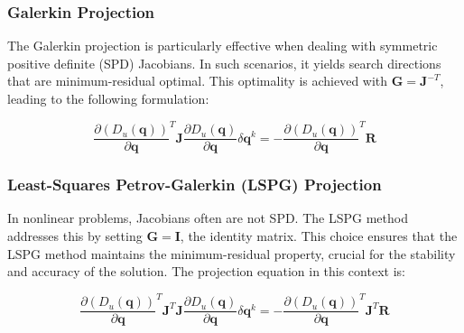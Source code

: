 \subsubsection{Galerkin Projection}
The Galerkin projection is particularly effective when dealing with symmetric positive definite (SPD) Jacobians. In such scenarios, it yields search directions that are minimum-residual optimal. This optimality is achieved with $\mathbf{G}=\mathbf{J}^{-T}$, leading to the following formulation:

\begin{equation}
\frac{\partial (D_u(\mathbf{q}))}{\partial \mathbf{q}}^T \mathbf{J} \frac{\partial D_u(\mathbf{q})}{\partial \mathbf{q}} \delta \mathbf{q}^{k} = - \frac{\partial (D_u(\mathbf{q}))}{\partial \mathbf{q}}^T \mathbf{R}
\label{eq:prom_general_galerkin}
\end{equation}

\subsubsection{Least-Squares Petrov-Galerkin (LSPG) Projection}
In nonlinear problems, Jacobians often are not SPD. The LSPG method addresses this by setting $\mathbf{G} = \mathbf{I}$, the identity matrix. This choice ensures that the LSPG method maintains the minimum-residual property, crucial for the stability and accuracy of the solution. The projection equation in this context is:

\begin{equation}
\frac{\partial (D_u(\mathbf{q}))}{\partial \mathbf{q}}^T \mathbf{J}^T \mathbf{J} \frac{\partial D_u(\mathbf{q})}{\partial \mathbf{q}} \delta \mathbf{q}^{k} = - \frac{\partial (D_u(\mathbf{q}))}{\partial \mathbf{q}}^T \mathbf{J}^T \mathbf{R}
\label{eq:prom_general_lspg}
\end{equation}

